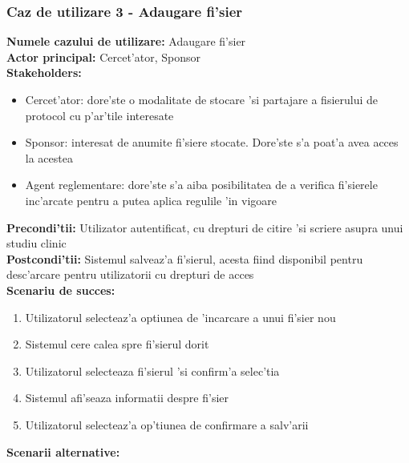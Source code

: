 \documentclass[12pt,a4paper,twoside]{report}
\begin{document}
\subsubsection{Caz de utilizare 3 - Adaugare fi'sier}
\textbf{Numele cazului de utilizare:} Adaugare fi'sier\\
\textbf{Actor principal:} Cercet'ator, Sponsor\\
\textbf{Stakeholders:}
\begin{itemize}
    \item Cercet'ator: dore'ste o modalitate de stocare 'si partajare a fisierului de protocol cu p'ar'tile interesate
    \item Sponsor: interesat de anumite fi'siere stocate. Dore'ste s'a poat'a avea acces la acestea
    \item Agent reglementare: dore'ste s'a aiba posibilitatea de a verifica fi'sierele inc'arcate pentru a putea aplica regulile 'in vigoare
\end{itemize}
\textbf{Precondi'tii:} Utilizator autentificat, cu drepturi de citire 'si scriere asupra unui studiu clinic\\
\textbf{Postcondi'tii:} Sistemul salveaz'a fi'sierul, acesta fiind disponibil pentru desc'arcare pentru utilizatorii cu drepturi de acces \\
\textbf{Scenariu de succes:} 
\begin{enumerate}
    \item Utilizatorul selecteaz'a optiunea de 'incarcare a unui fi'sier nou
    \item Sistemul cere calea spre fi'sierul dorit
    \item Utilizatorul selecteaza fi'sierul 'si confirm'a selec'tia
    \item Sistemul afi'seaza informatii despre fi'sier
    \item Utilizatorul selecteaz'a op'tiunea de confirmare a salv'arii
\end{enumerate}
\textbf{Scenarii alternative:}
\end{document}
